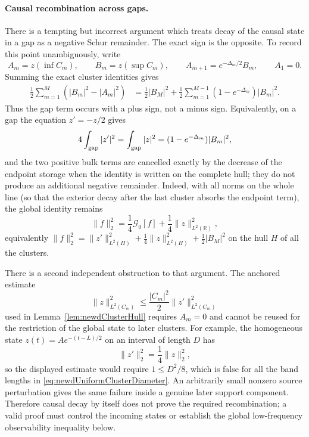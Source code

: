 \documentclass[11pt]{amsart}
\theoremstyle{definition}
\theoremstyle{remark}
\newcommand{\R}{\mathbb R}
\begin{document}
\paragraph{Causal recombination across gaps.}
There is a tempting but incorrect argument which treats decay of the causal
state in a gap as a negative Schur remainder.  The exact sign is the
opposite.  To record this point unambiguously, write
\[
 A_m=z(\inf C_m),\qquad B_m=z(\sup C_m),\qquad
 A_{m+1}=e^{-\Delta_m/2}B_m,\qquad A_1=0.
\]
Summing the exact cluster identities gives
\begin{align}
 \frac12\sum_{m=1}^M(|B_m|^2-|A_m|^2)
 &=\frac12|B_M|^2
   +\frac12\sum_{m=1}^{M-1}
      (1-e^{-\Delta_m})|B_m|^2.
 \label{eq:newdGapAuditSign}
\end{align}
Thus the gap term occurs with a plus sign, not a minus sign.  Equivalently,
on a gap the equation $z'=-z/2$ gives
\[
 4\int_{\rm gap}|z'|^2
 =\int_{\rm gap}|z|^2
 =(1-e^{-\Delta_m})|B_m|^2,
\]
and the two positive bulk terms are cancelled exactly by the decrease of
the endpoint storage when the identity is written on the complete hull;
they do not produce an additional negative remainder.  Indeed, with all
norms on the whole line (so that the exterior decay after the last cluster
absorbs the endpoint term), the global identity remains
\begin{equation}\label{eq:newdGlobalStateAuditIdentity}
 \|f\|_2^2
 =\frac14\mathcal G_0[f]
  +\frac14\|z\|_{L^2(\R)}^2,
\end{equation}
equivalently $\|f\|_2^2=\|z'\|_{L^2(H)}^2+\frac14\|z\|_{L^2(H)}^2
+\frac12|B_M|^2$ on the hull $H$ of all the clusters.

There is a second independent obstruction to that argument.  The anchored
estimate
\[
 \|z\|_{L^2(C_m)}^2
 \leq\frac{|C_m|^2}{2}\|z'\|_{L^2(C_m)}^2
\]
used in Lemma~\ref{lem:newdClusterHull} requires $A_m=0$ and cannot be
reused for the restriction of the global state to later clusters.  For
example, the homogeneous state $z(t)=Ae^{-(t-L)/2}$ on an interval of
length $D$ has
\[
 \|z'\|_2^2=\frac14\|z\|_2^2,
\]
so the displayed estimate would require $1\leq D^2/8$, which is false for
all the band lengths in \eqref{eq:newdUniformClusterDiameter}.  An
arbitrarily small nonzero source perturbation gives the same failure inside
a genuine later support component.  Therefore causal decay by itself does
not prove the required recombination; a valid proof must control the
incoming states or establish the global low-frequency observability
inequality below.
\end{document}
